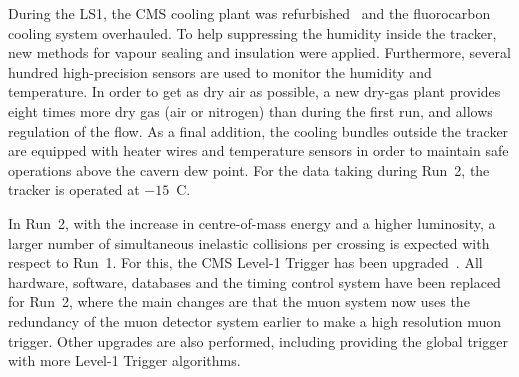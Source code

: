 During the LS1, the CMS cooling plant was refurbished~\cite{running:1998606} and the fluorocarbon cooling system overhauled. To help suppressing the humidity inside the tracker, new methods for vapour sealing and insulation were applied. Furthermore, several hundred high-precision sensors are used to monitor the humidity and temperature. In order to get as dry air as possible, a new dry-gas plant provides eight times more dry gas (air or nitrogen) than during the first run, and allows regulation of the flow. As a final addition, the cooling bundles outside the tracker are equipped with heater wires and temperature sensors in order to maintain safe operations above the cavern dew point. For the data taking during Run~2, the tracker is operated at $-15$~\degree C.

%		
%	
In Run~2, with the increase in centre-of-mass energy and a higher luminosity, a larger number of simultaneous inelastic collisions per crossing is expected with respect to Run~1. For this, the CMS Level-1 Trigger has been upgraded~\cite{1748-0221-12-03-C03021}. All hardware, software, databases and the timing control system have been replaced for Run~2, where the main changes are that the muon system now uses the redundancy of the muon detector system earlier to make a high resolution muon trigger. Other upgrades are also performed, including providing the global trigger with more Level-1 Trigger algorithms. 


